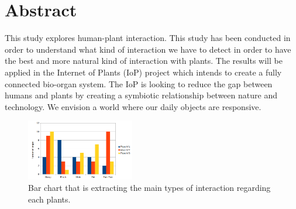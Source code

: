 \section*{Abstract}
\begin{textbf}


This study explores human-plant interaction.
This study has been conducted in order to understand what kind of interaction we have to detect in order to have the best and more natural kind of interaction with plants.
The results will be applied in the Internet of Plants (IoP) project which intends to create a fully connected bio-organ system.
The IoP is looking to reduce the gap between humans and plants by creating a symbiotic relationship between 
nature and technology. We envision a world where our daily objects are responsive.





\end{textbf}

\begin{figure}[ht]
    \centering
    \includegraphics[width=0.42\textwidth]{Images/plant_interaction_chart_1.png}
    \caption{Bar chart that is extracting the main types of interaction regarding each plants.}
    
    \vspace{-0.5cm}
    \vspace{0.2cm}
\end{figure}

\newpage